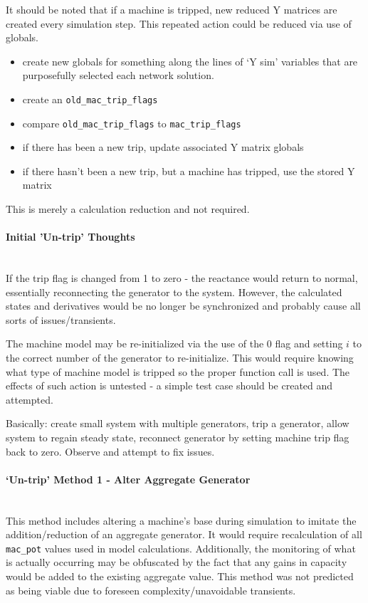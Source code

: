 \documentclass[12pt]{article}
\begin{document}
It should be noted that if a machine is tripped, new reduced Y matrices are created every simulation step.
This repeated action could be reduced via use of globals.
\begin{itemize}
\item create new globals for something along the lines of `Y sim' variables that are purposefully selected each network solution.
\item create an \verb|old_mac_trip_flags|
\item compare \verb|old_mac_trip_flags| to \verb|mac_trip_flags|
\item if there has been a new trip, update associated Y matrix globals
\item if there hasn't been a new trip, but a machine has tripped, use the stored Y matrix
\end{itemize} 
This is merely a calculation reduction and not required.

\pagebreak
\paragraph{Initial 'Un-trip' Thoughts} \ \\
If the trip flag is changed from 1 to zero - the reactance would return to normal, essentially reconnecting the generator to the system.
However, the calculated states and derivatives would be no longer be synchronized and probably cause all sorts of issues/transients.

The machine model may be re-initialized via the use of the 0 flag and setting $i$ to the correct number of the generator to re-initialize.
This would require knowing what type of machine model is tripped so the proper function call is used.
The effects of such action is untested - a simple test case should be created and attempted.

Basically:
create small system with multiple generators, trip a generator, allow system to regain steady state, reconnect generator by setting machine trip flag back to zero.
Observe and attempt to fix issues.

\paragraph{`Un-trip' Method 1 - Alter Aggregate Generator } \ \\
This method includes altering a machine's base during simulation to imitate the addition/reduction of an aggregate generator.
It would require recalculation of all \verb|mac_pot| values used in model calculations.
Additionally, the monitoring of what is actually occurring may be obfuscated by the fact that any gains in capacity would be added to the existing aggregate value.
This method was not predicted as being viable due to foreseen complexity/unavoidable transients.
\end{document}
